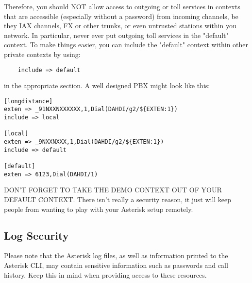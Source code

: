 Therefore, you should NOT allow access to outgoing or toll services in
contexts that are accessible (especially without a password) from incoming
channels, be they IAX channels, FX or other trunks, or even untrusted
stations within you network.  In particular, never ever put outgoing toll
services in the "default" context.  To make things easier, you can include
the "default" context within other private contexts by using:

\begin{astlisting}
\begin{verbatim}
	include => default
\end{verbatim}
\end{astlisting}

in the appropriate section.  A well designed PBX might look like this:

\begin{astlisting}
\begin{verbatim}
[longdistance]
exten => _91NXXNXXXXXX,1,Dial(DAHDI/g2/${EXTEN:1})
include => local

[local]
exten => _9NXXNXXX,1,Dial(DAHDI/g2/${EXTEN:1})
include => default

[default]
exten => 6123,Dial(DAHDI/1)
\end{verbatim}
\end{astlisting}

DON'T FORGET TO TAKE THE DEMO CONTEXT OUT OF YOUR DEFAULT CONTEXT.  There
isn't really a security reason, it just will keep people from wanting to
play with your Asterisk setup remotely.

\subsection{Log Security}

Please note that the Asterisk log files, as well as information printed to the
Asterisk CLI, may contain sensitive information such as passwords and call
history.  Keep this in mind when providing access to these resources.
